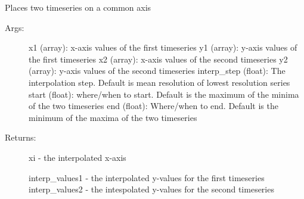 \documentclass[letterpaper,10pt,english]{sphinxmanual}
\begin{document}

\begin{fulllineitems}
\label{\detokenize{Timeseries:pyleoclim.Timeseries.onCommonAxis}}
Places two timeseries on a common axis
\begin{description}
\item[{Args:}] \leavevmode
x1 (array): x-axis values of the first timeseries
y1 (array): y-axis values of the first timeseries
x2 (array): x-axis values of the second timeseries
y2 (array): y-axis values of the second timeseries
interp\_step (float): The interpolation step. Default is mean resolution
of lowest resolution series
start (float): where/when to start. Default is the maximum of the minima of
the two timeseries
end (float): Where/when to end. Default is the minimum of the maxima of
the two timeseries

\item[{Returns:}] \leavevmode
xi -  the interpolated x-axis

interp\_values1 -  the interpolated y-values for the first timeseries
interp\_values2 - the intespolated y-values for the second timeseries

\end{description}

\end{fulllineitems}

\end{document}

